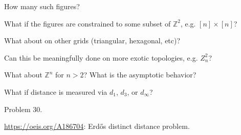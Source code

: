 \documentclass{article}
\begin{document}
\begin{related}
  \item How many such figures?
  \item What if the figures are constrained to some subset of $\mathbb Z^2$, e.g. $[n]\times[n]$?
  \item What about on other grids (triangular, hexagonal, etc)?
  \item Can this be meaningfully done on more exotic topologies, e.g. $Z_n^2$?
  \item What about $\mathbb Z^n$ for $n > 2$? What is the asymptotic behavior?
  \item What if distance is measured via $d_1$, $d_3$, or $d_\infty$?
\end{related}

\begin{references}
  \item Problem 30.
  \item \url{https://oeis.org/A186704}: Erd\H{o}s distinct distance problem.
\end{references}
\end{document}
